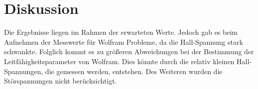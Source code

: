 \section{Diskussion}
\label{sec:Diskussion}
Die Ergebnisse liegen im Rahmen der erwarteten Werte. Jedoch
gab es beim Aufnehmen der Messwerte für Wolfram Probleme,
da die Hall-Spannung stark schwankte. Folglich kommt es zu größeren Abweichungen bei der Bestimmung der Leitfähigkeitsparameter von Wolfram.
Dies könnte durch die relativ kleinen Hall-Spannungen, die gemessen werden, entstehen.
Des Weiteren wurden die Störspannungen nicht berücksichtigt.
